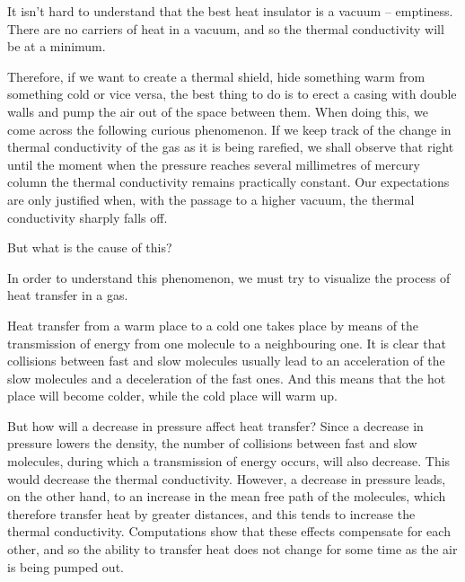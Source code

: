 It isn’t hard to understand that the best heat insulator is a vacuum -- emptiness. There are no carriers of heat in a vacuum, and so the thermal conductivity will be at a minimum.

Therefore, if we want to create a thermal shield, hide something warm from something cold or vice versa, the best thing to do is to erect a casing with double walls and pump the air out of the space between them. When doing this, we come across the following curious phenomenon. If we keep track of the change in thermal conductivity of the gas as it is being rarefied, we shall observe that right until the moment when the pressure reaches sev­eral millimetres of mercury column the thermal conduc­tivity remains practically constant. Our expectations are only justified when, with the passage to a higher vacuum, the thermal conductivity sharply falls off.

But what is the cause of this?

In order to understand this phenomenon, we must try to visualize the process of heat transfer in a gas.

Heat transfer from a warm place to a cold one takes place by means of the transmission of energy from one molecule to a neighbouring one. It is clear that collisions between fast and slow molecules usually lead to an ac­celeration of the slow molecules and a deceleration of the fast ones. And this means that the hot place will become colder, while the cold place will warm up.

But how will a decrease in pressure affect heat transfer? Since a decrease in pressure lowers the density, the num­ber of collisions between fast and slow molecules, during
which a transmission of energy occurs, will also decrease. This would decrease the thermal conductivity. However, a decrease in pressure leads, on the other hand, to an increase in the mean free path of the molecules, which therefore transfer heat by greater distances, and this tends to increase the thermal conductivity. Computations show that these effects compensate for each other, and so the ability to transfer heat does not change for some time as the air is being pumped out.

